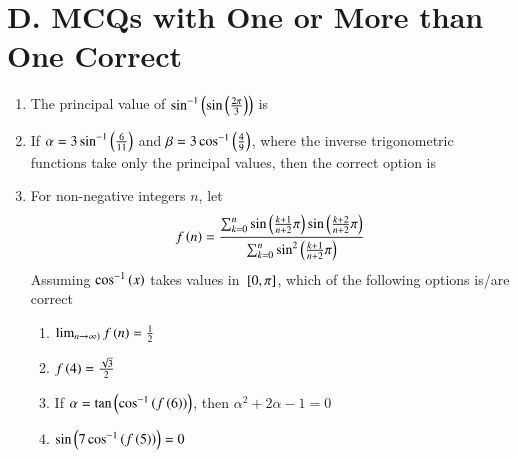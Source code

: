 \documentclass[journal,12pt,twocolumn,article]{IEEEtran}
\theoremstyle{remark}
\begin{document}
\section*{D. MCQs with One or More than One Correct}
\begin{enumerate}
\item The principal value of $\sin ^{-1}\left(\sin \left(\frac{2\pi}{3}\right)\right)$ is
\hfill {}
\begin{enumerate}
\end{enumerate}
\item If $\alpha=3\sin ^{-1}\left(\frac{6}{11}\right)$ and $\beta=3\cos ^{-1}\left(\frac{4}{9}\right)$, where the inverse trigonometric functions take only the principal values, then the correct option is
\hfill {}
\begin{enumerate}
\end{enumerate}
\item For non-negative integers $n$, let 
\begin{align*}
f\left(n\right)= \frac{\sum_{k=0}^{n} \sin \left(\frac{k+1}{n+2}\pi\right)\sin \left(\frac{k+2}{n+2}\pi\right)}{\sum_{k=0}^{n} \sin ^2 \left(\frac{k+1}{n+2}\pi\right)}
\end{align*}
Assuming $\cos ^{-1}\left(x\right)$ takes values in ${}\left[0,\pi\right]$, which of the following options is/are correct
\hfill {}
\begin{enumerate}
\item $\lim_{n \rightarrow \infty)} f\left(n\right) = \frac{1}{2}$ 
\item $f\left(4\right)=\frac{\sqrt{3}}{2}$
\item If $\alpha = \tan \left(\cos ^{-1}\left(f\left(6\right)\right)\right)$, then $\alpha ^2 + 2\alpha -1 =0$
\item $\sin \left(7\cos ^{-1}\left(f\left(5\right)\right)\right)=0$
\end{enumerate}
\end{enumerate}
\end{document}
